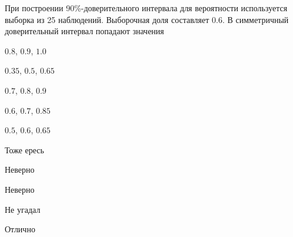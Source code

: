 
\begin{question}
При построении 90\%-доверительного интервала для вероятности
используется выборка из 25 наблюдений. Выборочная доля составляет 0.6. В
симметричный доверительный интервал попадают значения
\begin{answerlist}
  \item \(0.8\), \(0.9\), \(1.0\)
  \item \(0.35\), \(0.5\), \(0.65\)
  \item \(0.7\), \(0.8\), \(0.9\)
  \item \(0.6\), \(0.7\), \(0.85\)
  \item \(0.5\), \(0.6\), \(0.65\)
\end{answerlist}
\end{question}

\begin{solution}
\begin{answerlist}
  \item Тоже ересь
  \item Неверно
  \item Неверно
  \item Не угадал
  \item Отлично
\end{answerlist}
\end{solution}


